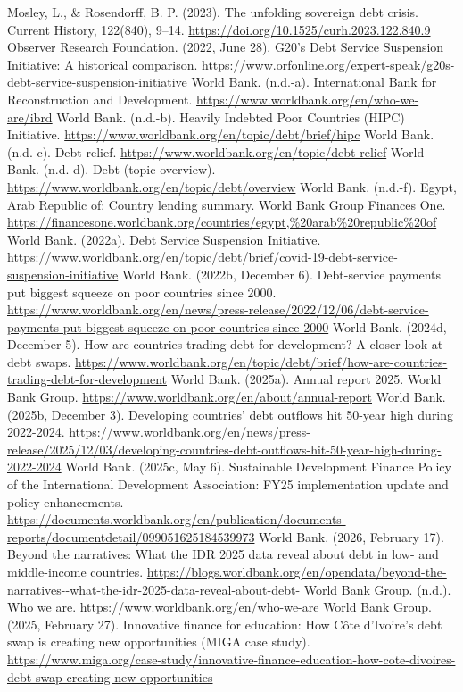 \begin{referencelist}
   Mosley, L., \& Rosendorff, B. P. (2023). The unfolding sovereign debt crisis. Current History, 122(840), 9–14. \url{https://doi.org/10.1525/curh.2023.122.840.9}
   Observer Research Foundation. (2022, June 28). G20's Debt Service Suspension Initiative: A historical comparison. \url{https://www.orfonline.org/expert-speak/g20s-debt-service-suspension-initiative}
   World Bank. (n.d.-a). International Bank for Reconstruction and Development. \url{https://www.worldbank.org/en/who-we-are/ibrd}
   World Bank. (n.d.-b). Heavily Indebted Poor Countries (HIPC) Initiative. \url{https://www.worldbank.org/en/topic/debt/brief/hipc}
   World Bank. (n.d.-c). Debt relief. \url{https://www.worldbank.org/en/topic/debt-relief}
   World Bank. (n.d.-d). Debt (topic overview). \url{https://www.worldbank.org/en/topic/debt/overview}
   World Bank. (n.d.-f). Egypt, Arab Republic of: Country lending summary. World Bank Group Finances One. \url{https://financesone.worldbank.org/countries/egypt,\%20arab\%20republic\%20of}
   World Bank. (2022a). Debt Service Suspension Initiative. \url{https://www.worldbank.org/en/topic/debt/brief/covid-19-debt-service-suspension-initiative}
   World Bank. (2022b, December 6). Debt-service payments put biggest squeeze on poor countries since 2000. \url{https://www.worldbank.org/en/news/press-release/2022/12/06/debt-service-payments-put-biggest-squeeze-on-poor-countries-since-2000}
   World Bank. (2024d, December 5). How are countries trading debt for development? A closer look at debt swaps. \url{https://www.worldbank.org/en/topic/debt/brief/how-are-countries-trading-debt-for-development}
   World Bank. (2025a). Annual report 2025. World Bank Group. \url{https://www.worldbank.org/en/about/annual-report}
   World Bank. (2025b, December 3). Developing countries' debt outflows hit 50-year high during 2022-2024. \url{https://www.worldbank.org/en/news/press-release/2025/12/03/developing-countries-debt-outflows-hit-50-year-high-during-2022-2024}
   World Bank. (2025c, May 6). Sustainable Development Finance Policy of the International Development Association: FY25 implementation update and policy enhancements. \url{https://documents.worldbank.org/en/publication/documents-reports/documentdetail/099051625184539973}
   World Bank. (2026, February 17). Beyond the narratives: What the IDR 2025 data reveal about debt in low- and middle-income countries. \url{https://blogs.worldbank.org/en/opendata/beyond-the-narratives--what-the-idr-2025-data-reveal-about-debt-}
   World Bank Group. (n.d.). Who we are. \url{https://www.worldbank.org/en/who-we-are}
   World Bank Group. (2025, February 27). Innovative finance for education: How Côte d'Ivoire's debt swap is creating new opportunities (MIGA case study). \url{https://www.miga.org/case-study/innovative-finance-education-how-cote-divoires-debt-swap-creating-new-opportunities}
\end{referencelist}
